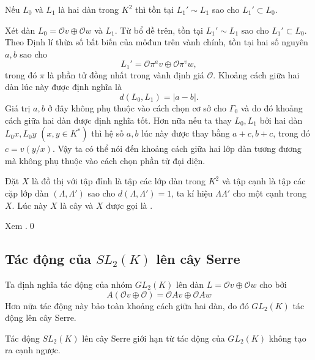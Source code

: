 \begin{lemma}
    Nếu $L_0$ và $L_1$ là hai dàn trong $K^2$ thì tồn tại $L_1' \sim L_1$ sao cho $L_1' \subset L_0$.
\end{lemma}

Xét dàn $L_0 = \mathcal{O}v \oplus \mathcal{O}w$ và $L_1$. Từ bổ đề trên, tồn tại $L_1' \sim L_1$ sao cho $L_1' \subset L_0$. Theo Định lí thừa số bất biến của môđun trên vành chính, tồn tại hai số nguyên $a,b$ sao cho
$$
    L_1' = \mathcal{O} \pi^a v \oplus \mathcal{O} \pi^v w,
$$
trong đó $\pi$ là phần tử đồng nhất trong vành định giá $\mathcal{O}$. Khoảng cách giữa hai dàn lúc này được định nghĩa là
$$
    d(L_0, L_1) = |a-b|.
$$
Giá trị $a,b$ ở đây không phụ thuộc vào cách chọn cơ sở cho $\Gamma_0$ và do đó khoảng cách giữa hai dàn được định nghĩa tốt. Hơn nữa nếu ta thay $L_0, L_1$ bởi hai dàn $L_0 x, L_0 y$ $(x,y \in K^*)$ thì hệ số $a,b$ lúc này được thay bằng $a+c, b+c$, trong đó $c = v(y/x)$. Vậy ta có thể nói đến khoảng cách giữa hai lớp dàn tương đương mà không phụ thuộc vào cách chọn phần tử đại diện.

\begin{define_theorem}
    Đặt $X$ là đồ thị với tập đỉnh là tập các lớp dàn trong $K^2$ và tập cạnh là tập các cặp lớp dàn $(\Lambda,\Lambda')$ sao cho $d(\Lambda,\Lambda') = 1$, ta kí hiệu $\Lambda \Lambda'$ cho một cạnh trong $X$. Lúc này $X$ là cây và $X$ được gọi là .
\end{define_theorem}

\startproof Xem \cite[Chương 2, Mục 1.1, Định lí 1]{TreeSerre}.\qed

\subsection{Tác động của $SL_2(K)$ lên cây Serre}

\begin{define}
    Ta định nghĩa tác động của nhóm $GL_2(K)$ lên dàn $L = \mathcal{O}v \oplus \mathcal{O}w$ cho bởi
    $$
        A(\mathcal{O}v \oplus \mathcal{O}) = \mathcal{O}Av \oplus \mathcal{O}Aw
    $$
    Hơn nữa tác động này bảo toàn khoảng cách giữa hai dàn, do đó $GL_2(K)$ tác động lên cây Serre.
\end{define}

\begin{proposition}
    Tác động $SL_2(K)$ lên cây Serre giới hạn từ tác động của $GL_2(K)$ không tạo ra cạnh ngược.
\end{proposition}

